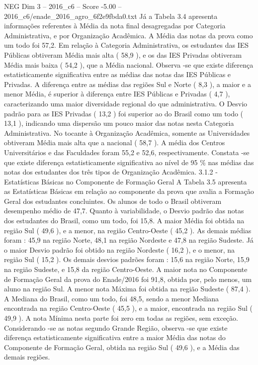 \begin{textsample}{NEG Dim 3 – 2016\_c6 – Score -5.00 – 2016\_c6/enade\_2016\_agro\_6f2e9fbda0.txt}
Já a Tabela 3.4 apresenta informações referentes à Média da nota final desagregadas por Categoria Administrativa, e por Organização Acadêmica.
A Média das notas da prova como um todo foi 57,2.
Em relação à Categoria Administrativa, os estudantes das IES Públicas obtiveram Média mais alta ( 58,9 ), e os das IES Privadas obtiveram Média mais baixa ( 54,2 ), que a Média nacional.
Observa -se que existe diferença estatisticamente significativa entre as médias das notas das IES Públicas e Privadas.
A diferença entre as médias das regiões Sul e Norte ( 8,3 ), a maior e a menor Média, é superior à diferença entre IES Públicas e Privadas ( 4,7 ), caracterizando uma maior diversidade regional do que administrativa.
O Desvio padrão para as IES Privadas ( 13,2 ) foi superior ao do Brasil como um todo ( 13,1 ), indicando uma dispersão um pouco maior das notas nesta Categoria Administrativa.
No tocante à Organização Acadêmica, somente as Universidades obtiveram Média mais alta que a nacional ( 58,7 ).
A média dos Centros Universitários e das Faculdades foram 55,2 e 52,6, respectivamente.
Constata -se que existe diferença estatisticamente significativa ao nível de 95 \% nas médias das notas dos estudantes dos três tipos de Organização Acadêmica. 3.1.2 - Estatísticas Básicas no Componente de Formação Geral A Tabela 3.5 apresenta as Estatísticas Básicas em relação ao componente da prova que avalia a Formação Geral dos estudantes concluintes.
Os alunos de todo o Brasil obtiveram desempenho médio de 47,7.
Quanto à variabilidade, o Desvio padrão das notas dos estudantes do Brasil, como um todo, foi 15,8.
A maior Média foi obtida na região Sul ( 49,6 ), e a menor, na região Centro-Oeste ( 45,2 ).
As demais médias foram : 45,9 na região Norte, 48,1 na região Nordeste e 47,8 na região Sudeste.
Já o maior Desvio padrão foi obtido na região Nordeste ( 16,2 ), e o menor, na região Sul ( 15,2 ).
Os demais desvios padrões foram : 15,6 na região Norte, 15,9 na região Sudeste, e 15,8 da região Centro-Oeste.
A maior nota no Componente de Formação Geral da prova do Enade/2016 foi 91,8, obtida por, pelo menos, um aluno na região Sul.
A menor nota Máxima foi obtida na região Sudeste ( 87,4 ).
A Mediana do Brasil, como um todo, foi 48,5, sendo a menor Mediana encontrada na região Centro-Oeste ( 45,5 ), e a maior, encontrada na região Sul ( 49,9 ).
A nota Mínima nesta parte foi zero em todas as regiões, sem exceção.
Considerando -se as notas segundo Grande Região, observa -se que existe diferença estatisticamente significativa entre a maior Média das notas do Componente de Formação Geral, obtida na região Sul ( 49,6 ), e a Média das demais regiões.

\end{textsample}
